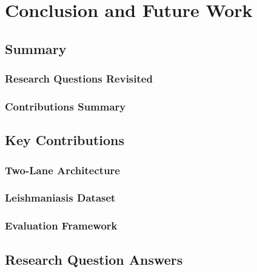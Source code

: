 \chapter{Conclusion and Future Work}
\label{ch:conclusion}

%
%
\section{Summary}
\label{sec:conclusion:summary}

\subsection{Research Questions Revisited}
\label{subsec:conclusion:summary:rqs}

\subsection{Contributions Summary}
\label{subsec:conclusion:summary:contributions}

%
%
\section{Key Contributions}
\label{sec:conclusion:contributions}

\subsection{Two-Lane Architecture}
\label{subsec:conclusion:contributions:architecture}

\subsection{Leishmaniasis Dataset}
\label{subsec:conclusion:contributions:dataset}

\subsection{Evaluation Framework}
\label{subsec:conclusion:contributions:evaluation}

%
%
\section{Research Question Answers}
\label{sec:conclusion:answers}

